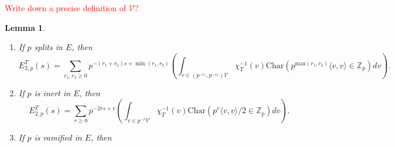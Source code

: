 \documentclass[12pt]{article}
\newtheorem{lemma}[thm]{Lemma}
\theoremstyle{remark}
\theoremstyle{definition}
\newcommand{\Z}{\mathbb{Z}}
\newcommand{\lrangle}[2]{\langle #1,#2\rangle}
\newcommand{\rmm}[1]{\mathrm{#1}}
\newcommand{\call}[1]{\mathcal{#1}}
\begin{document}
\textcolor{red}{Write down a precise definition of $\call{V}$?}
\begin{lemma}\label{lemma finite rank 2 coefficients}
    \begin{enumerate}
        \item If $p$ splits in $E$,
        then 
        \[E_{2,p}^{T}(s)=\sum_{r_{1},r_{2}\geq 0}p^{-(r_{1}+r_{2})s+\min(r_{1},r_{2})}\left(\int_{v\in (p^{-r_{1}},p^{-r_{2}})\call{V}}\chi_{T}^{-1}(v)\rmm{Char}(p^{\rmm{max}(r_{1},r_{2})}\lrangle{v}{v}\in \Z_{p})dv\right).\]
        \item If $p$ is inert in $E$,
        then
        \[E_{2,p}^{T}(s)=\sum_{r\geq 0}p^{-2rs+r}\left(\int_{v\in p^{-r}\call{V}}\chi_{T}^{-1}(v)\rmm{Char}\left(p^{r}\lrangle{v}{v}/2\in \Z_{p}\right)dv\right).\] 
        \item If $p$ is ramified in $E$, then 
    \end{enumerate}
\end{lemma}
\end{document}
